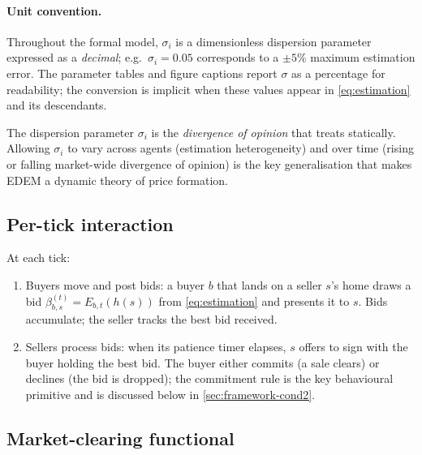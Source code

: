 \paragraph{Unit convention.} Throughout the formal model,
$\sigma_{i}$ is a dimensionless dispersion parameter expressed as a
\emph{decimal}; e.g.\ $\sigma_{i} = 0.05$ corresponds to a $\pm 5\%$
maximum estimation error. The parameter tables and figure captions
report $\sigma$ as a percentage for readability; the conversion is
implicit when these values appear in \cref{eq:estimation} and its
descendants.

The dispersion parameter $\sigma_{i}$ is the \emph{divergence of
opinion} that \citet{miller1977} treats statically. Allowing
$\sigma_{i}$ to vary across agents (estimation heterogeneity) and over
time (rising or falling market-wide divergence of opinion) is the key
generalisation that makes EDEM a dynamic theory of price formation.

\subsection{Per-tick interaction}
\label{sec:framework-interaction}

At each tick:
\begin{enumerate}[leftmargin=*,nosep]
\item Buyers move and post bids: a buyer $b$ that lands on a seller
      $s$'s home draws a bid $\beta_{b,s}^{(t)} = E_{b,t}(h(s))$ from
      \cref{eq:estimation} and presents it to $s$. Bids accumulate;
      the seller tracks the best bid received.
\item Sellers process bids: when its patience timer elapses, $s$
      offers to sign with the buyer holding the best bid. The buyer
      either commits (a sale clears) or declines (the bid is
      dropped); the commitment rule is the key behavioural primitive
      and is discussed below in \cref{sec:framework-cond2}.
\end{enumerate}

\subsection{Market-clearing functional}
\label{sec:framework-clearing}

